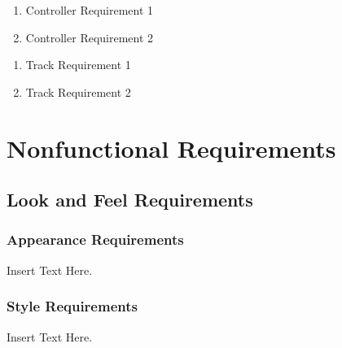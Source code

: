 \documentclass [12pt]{article}
\begin{document}
\begin{enumerate}[\textbf{VI-1:}]
	\setlength{\itemindent}{.2in}
	\itemsep0pt 
	\item Controller Requirement 1
	\item Controller Requirement 2

\end{enumerate}


\begin{enumerate}[\textbf{TK-1:}]
	\setlength{\itemindent}{.2in}
	\itemsep0pt 
	\item Track Requirement 1
	\item Track Requirement 2

\end{enumerate}

%
%



\section {Nonfunctional Requirements} 



\subsection {Look and Feel Requirements}
\subsubsection{Appearance Requirements}
Insert Text Here. 

\subsubsection{Style Requirements}
Insert Text Here. 
\end{document}
